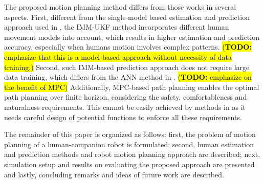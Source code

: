 \documentclass[letterpaper, 10 pt, conference]{ieeeconf}
\newcommand{\todohere}[1]{\hl{(\textbf{TODO:} #1)}}
\begin{document}
	The proposed motion planning method differs from those works in several aspects.
	First, different from the single-model based estimation and prediction approach used in \cite{cosgun2013autonomous},  the IMM-UKF method incorporates different human movement models into account, which results in higher estimation and prediction accuracy, especially when humans motion involves complex patterns.
	\todohere{emphasize that this is a model-based approach without necessity of data training.} 
	Second, such IMM-based prediction approach does not require large data training, which differs from the ANN method in \cite{wu2012path}. 
	\todohere{emphasize on the benefit of MPC}
	Additionally, MPC-based path planning enables the optimal path planning over finite horizon, considering the safety, comfortableness and naturalness requirements.
	This cannot be easily achieved by methods in \cite{hoeller2007accompanying} as it needs careful design of potential functions to enforce all these requirements.
	
	The remainder of this paper is organized as follows:
	first, the problem of motion planning of a human-companion robot is formulated;
	second, human estimation and prediction methods and robot motion planning approach are described;
	next, simulation setup and results on evaluating the proposed approach are presented and lastly, concluding remarks and ideas of future work are described.
	
	
\end{document}
